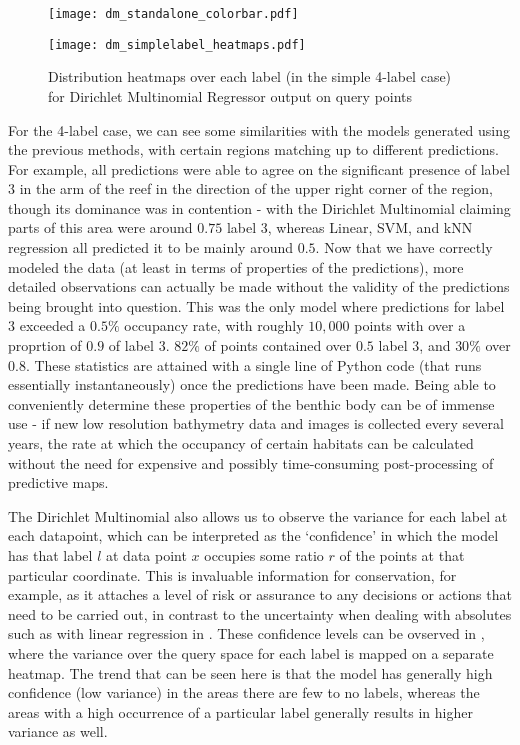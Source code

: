 \begin{figure}[H]
    \begin{minipage}{\linewidth}
        \centerline{\texttt{[image: dm\_standalone\_colorbar.pdf]}}
        \centerline{\texttt{[image: dm\_simplelabel\_heatmaps.pdf]}}
        \caption{Distribution heatmaps over each label (in the simple 4-label case) for Dirichlet Multinomial Regressor output on query points}
        \label{fig:dm_4label_heatmap}
    \end{minipage}
    \hfill
\end{figure}

For the 4-label case, we can see some similarities with the models generated using the previous methods, with certain regions matching up to different predictions. For example, all predictions were able to agree on the significant presence of label $3$ in the arm of the reef in the direction of the upper right corner of the region, though its dominance was in contention - with the Dirichlet Multinomial claiming parts of this area were around $0.75$ label 3, whereas Linear, SVM, and kNN regression all predicted it to be mainly around $0.5$. Now that we have correctly modeled the data (at least in terms of properties of the predictions), more detailed observations can actually be made without the validity of the predictions being brought into question. This was the only model where predictions for label 3 exceeded a $0.5\%$ occupancy rate, with roughly $10,000$ points with over a proprtion of $0.9$ of label 3. $82\%$ of points contained over $0.5$ label 3, and $30\%$ over $0.8$. These statistics are attained with a single line of Python code (that runs essentially instantaneously) once the predictions have been made. Being able to conveniently determine these properties of the benthic body can be of immense use - if new low resolution bathymetry data and images is collected every several years, the rate at which the occupancy of certain habitats can be calculated without the need for expensive and possibly time-consuming post-processing of predictive maps.

The Dirichlet Multinomial also allows us to observe the variance for each label at each datapoint, which can be interpreted as the `confidence' in which the model has that label $l$ at data point $x$ occupies some ratio $r$ of the points at that particular coordinate. This is invaluable information for conservation, for example, as it attaches a level of risk or assurance to any decisions or actions that need to be carried out, in contrast to the uncertainty when dealing with absolutes such as with linear regression in . These confidence levels can be ovserved in , where the variance over the query space for each label is mapped on a separate heatmap. The trend that can be seen here is that the model has generally high confidence (low variance) in the areas there are few to no labels, whereas the areas with a high occurrence of a particular label generally results in higher variance as well.

